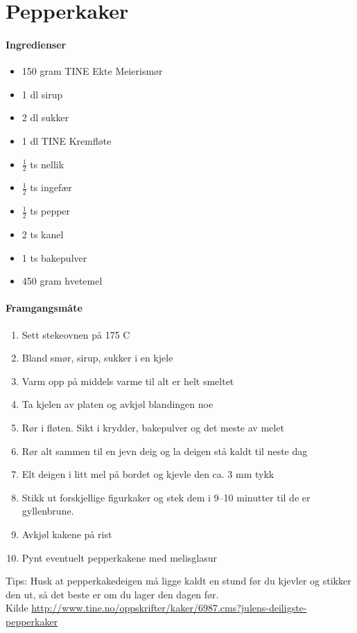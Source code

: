 \section{﻿Pepperkaker}


\paragraph{Ingredienser}
\begin{itemize}[noitemsep]
	\item 150 gram TINE Ekte Meierismør
	\item 1 dl sirup
	\item 2 dl sukker
	\item 1 dl TINE Kremfløte
	\item $\frac{1}{2}$ ts nellik
	\item $\frac{1}{2}$ ts ingefær
	\item $\frac{1}{2}$ ts pepper
	\item 2 ts kanel
	\item 1 ts bakepulver
	\item 450 gram hvetemel
\end{itemize}

\paragraph{Framgangsmåte}
\begin{enumerate}[noitemsep]
	\item Sett stekeovnen på 175 \degree C
	\item Bland smør, sirup, sukker i en kjele
	\item Varm opp på middels varme til alt er helt smeltet
	\item Ta kjelen av platen og avkjøl blandingen noe
	\item Rør i fløten. Sikt i krydder, bakepulver og det meste av melet
	\item Rør alt sammen til en jevn deig og la deigen stå kaldt til neste dag
	\item Elt deigen i litt mel på bordet og kjevle den ca. 3 mm tykk
	\item Stikk ut forskjellige figurkaker og stek dem i 9--10 minutter til de er gyllenbrune.
	\item Avkjøl kakene på rist
	\item Pynt eventuelt pepperkakene med melisglasur
\end{enumerate}



Tips: Husk at pepperkakedeigen må ligge kaldt en stund før du kjevler og stikker den ut, så det beste er om du lager den dagen før.\\

Kilde \url{http://www.tine.no/oppskrifter/kaker/6987.cms?julens-deiligste-pepperkaker}
